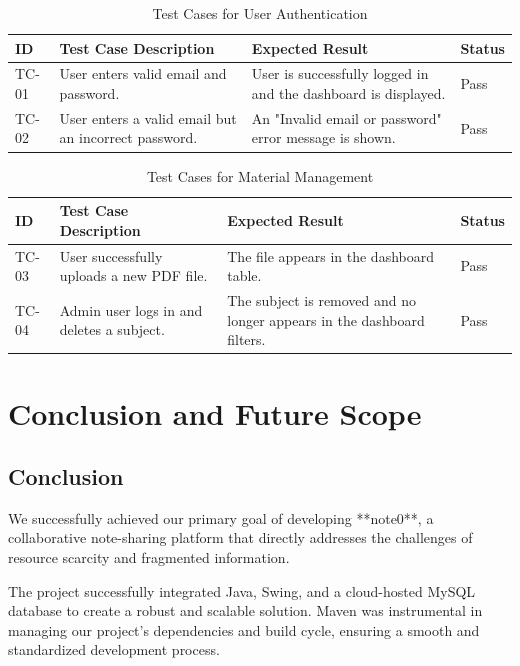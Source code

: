 \documentclass[12pt, a4paper]{report}
\begin{document}
\begin{itemize}
\begin{table}[h!]
    \centering
    \caption{Test Cases for User Authentication}
    \label{tab:auth_tests}
    \begin{tabular}{|p{1cm}|p{4.5cm}|p{4.5cm}|p{2cm}|}
        \hline
        \textbf{ID} & \textbf{Test Case Description} & \textbf{Expected Result} & \textbf{Status} \\
        \hline
        TC-01 & User enters valid email and password. & User is successfully logged in and the dashboard is displayed. & Pass \\
        \hline
        TC-02 & User enters a valid email but an incorrect password. & An "Invalid email or password" error message is shown. & Pass \\
        \hline
    \end{tabular}
\end{table}

\begin{table}[h!]
    \centering
    \caption{Test Cases for Material Management}
    \label{tab:material_tests}
    \begin{tabular}{|p{1cm}|p{4.5cm}|p{4.5cm}|p{2cm}|}
        \hline
        \textbf{ID} & \textbf{Test Case Description} & \textbf{Expected Result} & \textbf{Status} \\
        \hline
        TC-03 & User successfully uploads a new PDF file. & The file appears in the dashboard table. & Pass \\
        \hline
        TC-04 & Admin user logs in and deletes a subject. & The subject is removed and no longer appears in the dashboard filters. & Pass \\
        \hline
    \end{tabular}
\end{table}
\chapter{Conclusion and Future Scope}

\section{Conclusion}
We successfully achieved our primary goal of developing **note0**, a collaborative note-sharing platform that directly addresses the challenges of resource scarcity and fragmented information.

The project successfully integrated Java, Swing, and a cloud-hosted MySQL database to create a robust and scalable solution. Maven was instrumental in managing our project's dependencies and build cycle, ensuring a smooth and standardized development process.


\end{itemize}
\end{document}
